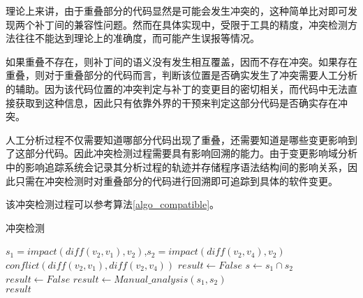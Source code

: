 %

理论上来讲，由于重叠部分的代码显然是可能会发生冲突的，这种简单比对即可发现两个补丁间的兼容性问题。然而在具体实现中，受限于工具的精度，冲突检测方法往往不能达到理论上的准确度，而可能产生误报等情况。

如果重叠不存在，则补丁间的语义没有发生相互覆盖，因而不存在冲突。如果存在重叠，则对于重叠部分的代码而言，判断该位置是否确实发生了冲突需要人工分析的辅助。因为该代码位置的冲突判定与补丁的变更目的密切相关，而代码中无法直接获取到这种信息，因此只有依靠外界的干预来判定这部分代码是否确实存在冲突。

人工分析过程不仅需要知道哪部分代码出现了重叠，还需要知道是哪些变更影响到了这部分代码。因此冲突检测过程需要具有影响回溯的能力。由于变更影响域分析中的影响追踪系统会记录其分析过程的轨迹并存储程序语法结构间的影响关系，因此只需在冲突检测时对重叠部分的代码进行回溯即可追踪到具体的软件变更。


该冲突检测过程可以参考算法\ref {algo_compatible}。

\begin{algorithm}[H]
	\caption{冲突检测}
	\label{algo_compatible}
	\begin{algorithmic}[1]
		\Require $s_1=impact(diff(v_2,v_1),v_2)$,$s_2=impact(diff(v_2,v_4),v_2)$
		\Ensure $conflict(diff(v_2,v_1),diff(v_2,v_4))$
		\State $result \gets False$
		\Else
		\State $s \gets s_1 \cap s_2$
		\State $result \gets False$
		\Else				
		\State $result \gets Manual\_analysis(s_1, s_2)$
		\EndIf 
		\EndIf \\
		\Return $result$
	\end{algorithmic}
\end{algorithm}


